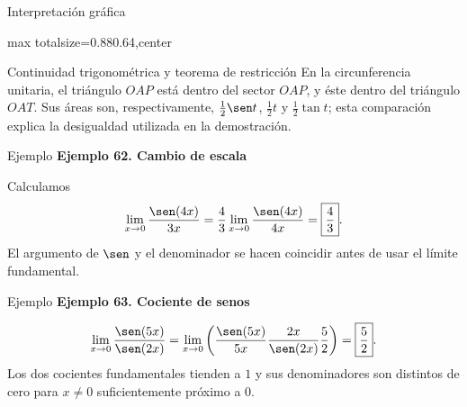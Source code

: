 \documentclass[12pt,aspectratio=169]{beamer}
\begin{document}
\begin{frame}[t,allowframebreaks]{Interpretación gráfica}
\begin{center}
\begin{adjustbox}{max totalsize={0.88\linewidth}{0.64\textheight},center}\end{adjustbox}
\end{center}
\end{frame}


\begin{frame}[t,allowframebreaks]{Continuidad trigonométrica y teorema de restricción}
En la circunferencia unitaria, el triángulo $OAP$ está dentro del sector $OAP$, y éste dentro del triángulo $OAT$. Sus áreas son, respectivamente, $\frac12\sen t$, $\frac12t$ y $\frac12\tan t$; esta comparación explica la desigualdad utilizada en la demostración.
\end{frame}


\begin{frame}[t,allowframebreaks]{Ejemplo}
{\color{azul}\bfseries Ejemplo 62. Cambio de escala}\par\medskip

Calculamos
\[
 \lim_{x\to0}\frac{\sen(4x)}{3x}
 =\frac43\lim_{x\to0}\frac{\sen(4x)}{4x}
 =\boxed{\frac43}.
\]
El argumento de $\sen$ y el denominador se hacen coincidir antes de usar el límite fundamental.
\end{frame}


\begin{frame}[t,allowframebreaks]{Ejemplo}
{\color{azul}\bfseries Ejemplo 63. Cociente de senos}\par\medskip

\[
 \lim_{x\to0}\frac{\sen(5x)}{\sen(2x)}
 =\lim_{x\to0}\left(\frac{\sen(5x)}{5x}\frac{2x}{\sen(2x)}\frac52\right)
 =\boxed{\frac52}.
\]
Los dos cocientes fundamentales tienden a $1$ y sus denominadores son distintos de cero para $x\ne0$ suficientemente próximo a $0$.
\end{frame}
\end{document}
